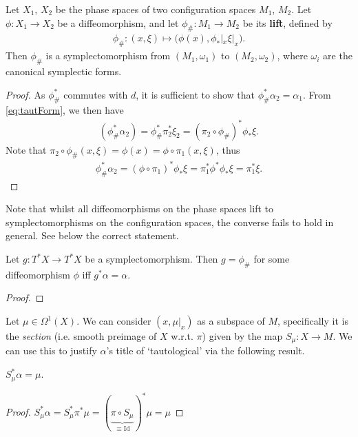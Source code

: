 \documentclass[11pt, final]{article}
\begin{document}
\begin{prop}
	Let $X_1$, $X_2$ be the phase spaces of two configuration spaces $M_1$, $M_2$. Let $\phi: X_1 \to X_2$ be a diffeomorphism, and let $\phi_\# : M_1 \to M_2$ be its \textbf{lift}, defined by
		\begin{align}
			\phi_\#: (x, \xi) \mapsto \big(\phi(x), \phi_*|_x \xi|_x \big).
		\end{align}
	Then $\phi_\#$ is a symplectomorphism from $(M_1,\omega_1)$ to $(M_2,\omega_2)$, where $\omega_i$ are the canonical symplectic forms.
\end{prop}
\begin{proof}
	As $\phi^*_\#$ commutes with $d$, it is sufficient to show that $\phi^*_\# \alpha_2 = \alpha_1$. From \eqref{eq:tautForm}, we then have
		\begin{align}
			(\phi^*_\# \alpha_2)
			= \phi^*_\# \pi_2^* \xi_2
			= (\pi_2 \circ \phi_\# )^* \phi_* \xi.
		\end{align}
	Note that $\pi_2 \circ \phi_\# (x,\xi) = \phi(x) = \phi \circ \pi_1 (x,\xi)$, thus
		\begin{align}
			\phi^*_\# \alpha_2 = (\phi \circ \pi_1)^* \phi_* \xi = \pi_1^* \phi^* \phi_* \xi = \pi_1^* \xi.
		\end{align}
\end{proof}
\begin{remark}
	Note that whilst all diffeomorphisms on the phase spaces lift to symplectomorphisms on the configuration spaces, the converse fails to hold in general. See below the correct statement.
\end{remark}

\begin{prop}
	Let $g: T^*X \to T^*X$ be a symplectomorphism. Then $g = \phi_\#$ for some diffeomorphism $\phi$ iff $g^* \alpha = \alpha$.
\end{prop}
\begin{proof}
\end{proof}

\begin{remark}
	Let $\mu \in \Omega^1(X)$. We can consider $(x,\mu|_x)$ as a subspace of $M$, specifically it is the \textit{section} (i.e. smooth preimage of $X$ w.r.t. $\pi$) given by the map $S_\mu: X \to M$. We can use this to justify $\alpha$'s title of `tautological' via the following result.
\end{remark}
\begin{prop}\label{prop:tautologicality}
	$S_\mu^* \alpha = \mu$.
\end{prop}
\begin{proof}
	$S_\mu^* \alpha = S_\mu^* \pi^* \mu = (\underbrace{\pi \circ S_\mu}_{\equiv \mathrm{Id}})^* \mu = \mu$
\end{proof}
\end{document}
